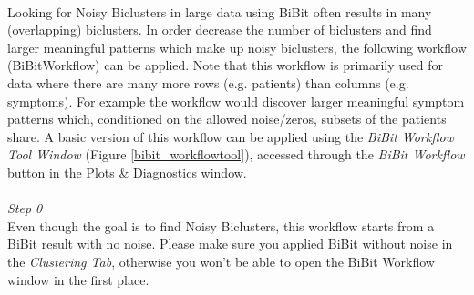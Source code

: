 \documentclass[a4paper]{article}\usepackage[]{graphicx}\usepackage[]{color}
\begin{document}
\\
Looking for Noisy Biclusters in large data using BiBit often results in many (overlapping) biclusters. In order decrease the number of biclusters and find larger meaningful patterns which make up noisy biclusters, the following workflow (BiBitWorkflow) can be applied. Note that this workflow is primarily used for data where there are many more rows (e.g. patients) than columns (e.g. symptoms). For example the workflow would discover larger meaningful symptom patterns which, conditioned on the allowed noise/zeros, subsets of the patients share. A basic version of this workflow can be applied using the {\it BiBit Workflow Tool Window} (Figure \ref{bibit_workflowtool}), accessed through the {\it BiBit Workflow} button in the Plots \& Diagnostics window.
\\ \\
{\it Step 0}\\
Even though the goal is to find Noisy Biclusters, this workflow starts from a BiBit result with no noise. Please make sure you applied BiBit without noise in the {\it Clustering Tab}, otherwise you won't be able to open the BiBit Workflow window in the first place.
\end{document}
